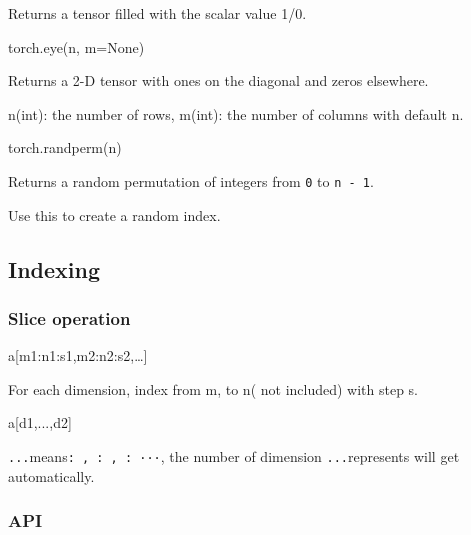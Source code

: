 \documentclass[
]{article}
\newenvironment{Shaded}{}{}
\newcommand{\NormalTok}[1]{#1}
\newcommand{\OperatorTok}[1]{\textcolor[rgb]{0.40,0.40,0.40}{#1}}
\newcommand{\VariableTok}[1]{\textcolor[rgb]{0.10,0.09,0.49}{#1}}
\begin{document}
Returns a tensor filled with the scalar value 1/0.

\begin{Shaded}
\begin{Highlighting}[]
\NormalTok{torch.eye(n, m}\OperatorTok{=}\VariableTok{None}\NormalTok{)}
\end{Highlighting}
\end{Shaded}

Returns a 2-D tensor with ones on the diagonal and zeros elsewhere.

n(int): the number of rows, m(int): the number of columns with default
n.

\begin{Shaded}
\begin{Highlighting}[]
\NormalTok{torch.randperm(n)}
\end{Highlighting}
\end{Shaded}

Returns a random permutation of integers from \texttt{0} to
\texttt{n\ -\ 1}.

Use this to create a random index.

\hypertarget{header-n1158}{%
\subsection{Indexing}\label{header-n1158}}

\hypertarget{header-n1154}{%
\subsubsection{Slice operation}\label{header-n1154}}

\begin{Shaded}
\begin{Highlighting}[]
\NormalTok{a[m1:n1:s1,m2:n2:s2,…]}
\end{Highlighting}
\end{Shaded}

For each dimension, index from m, to n( not included) with step s.

\begin{Shaded}
\begin{Highlighting}[]
\NormalTok{a[d1,...,d2]}
\end{Highlighting}
\end{Shaded}

\texttt{...}means\texttt{:\ ,\ :\ ,\ :\ ···}, the number of dimension
\texttt{...}represents will get automatically.

\hypertarget{header-n1181}{%
\subsubsection{API}\label{header-n1181}}
\end{document}
